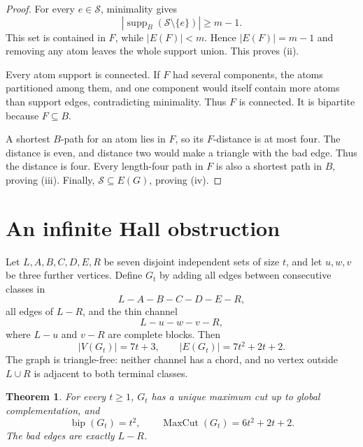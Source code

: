 \documentclass[11pt]{article}
\newtheorem{theorem}{Theorem}[section]
\theoremstyle{definition}
\newcommand{\bip}{\operatorname{bip}}
\newcommand{\supp}{\operatorname{supp}}
\newcommand{\mc}{\operatorname{MaxCut}}
\begin{document}
\begin{proof}
For every \(e\in\mathcal S\), minimality gives
\[
 |\supp_B(\mathcal S\setminus\{e\})|\ge m-1.
\]
This set is contained in \(F\), while \(|E(F)|<m\). Hence
\(|E(F)|=m-1\) and removing any atom leaves the whole support union.
This proves (ii).

Every atom support is connected. If \(F\) had several components, the
atoms partitioned among them, and one component would itself contain more
atoms than support edges, contradicting minimality. Thus \(F\) is
connected. It is bipartite because \(F\subseteq B\).

A shortest \(B\)-path for an atom lies in \(F\), so its \(F\)-distance is
at most four. The distance is even, and distance two would make a triangle
with the bad edge. Thus the distance is four. Every length-four path in
\(F\) is also a shortest path in \(B\), proving (iii). Finally,
\(\mathcal S\subseteq E(G)\), proving (iv).
\end{proof}

\section{An infinite Hall obstruction}

Let \(L,A,B,C,D,E,R\) be seven disjoint independent sets of size \(t\),
and let \(u,w,v\) be three further vertices. Define \(G_t\) by adding
all edges between consecutive classes in
\[
 L-A-B-C-D-E-R,
\]
all edges of \(L-R\), and the thin channel
\[
 L-u-w-v-R,
\]
where \(L-u\) and \(v-R\) are complete blocks. Then
\[
 |V(G_t)|=7t+3,\qquad |E(G_t)|=7t^2+2t+2.
\]
The graph is triangle-free: neither channel has a chord, and no vertex
outside \(L\cup R\) is adjacent to both terminal classes.

\begin{theorem}\label{thm:family}
For every \(t\ge1\), \(G_t\) has a unique maximum cut up to global
complementation, and
\[
 \bip(G_t)=t^2,\qquad \mc(G_t)=6t^2+2t+2.
\]
The bad edges are exactly \(L-R\).
\end{theorem}
\end{document}

